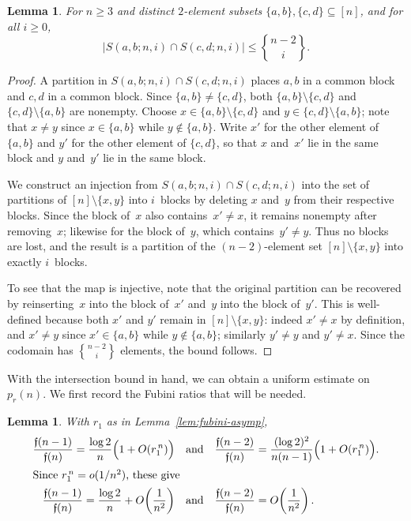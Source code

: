 \documentclass[a4paper,11pt,UKenglish]{article}
\newcommand{\setstirling}[2]{%
  \genfrac{\{}{\}}{0pt}{}{{#1}}{{#2}}}
\newcommand{\fub}[1]{\mathfrak{f}(#1)}
\newtheorem{lemma}[theorem]{Lemma}
\theoremstyle{definition}
\begin{document}
\begin{lemma}\label{lem:intersection}
For $n \geq 3$ and distinct $2$-element subsets
$\{a,b\}, \{c,d\} \subseteq [n]$, and for all $i\ge 0$,
\[
  |S(a,b;n,i) \cap S(c,d;n,i)| \leq \setstirling{n-2}{i}.
\]
\end{lemma}

\begin{proof}
A partition in $S(a,b;n,i) \cap S(c,d;n,i)$ places $a,b$ in a
common block and $c,d$ in a common block.
Since $\{a,b\} \neq \{c,d\}$, both
$\{a,b\} \setminus \{c,d\}$ and $\{c,d\} \setminus \{a,b\}$
are nonempty.
Choose $x \in \{a,b\} \setminus \{c,d\}$ and
$y \in \{c,d\} \setminus \{a,b\}$;
note that $x \neq y$ since $x \in \{a,b\}$ while
$y \notin \{a,b\}$.
Write $x'$ for the other element of $\{a,b\}$ and $y'$ for the
other element of $\{c,d\}$, so that $x$ and~$x'$ lie in the same
block and $y$ and~$y'$ lie in the same block.

We construct an injection from $S(a,b;n,i) \cap S(c,d;n,i)$ into
the set of partitions of $[n] \setminus \{x,y\}$ into $i$~blocks
by deleting $x$ and~$y$ from their respective blocks.
Since the block of~$x$ also contains~$x' \neq x$, it remains
nonempty after removing~$x$; likewise for the block of~$y$, which
contains~$y' \neq y$.
Thus no blocks are lost, and the result is a partition of the
$(n-2)$-element set $[n] \setminus \{x,y\}$ into exactly
$i$~blocks.

To see that the map is injective, note that the original partition
can be recovered by reinserting~$x$ into the block of~$x'$ and~$y$
into the block of~$y'$.
This is well-defined because both $x'$ and $y'$ remain in
$[n]\setminus\{x,y\}$: indeed $x' \neq x$ by definition,
and $x' \neq y$ since $x' \in \{a,b\}$ while $y \notin \{a,b\}$;
similarly $y' \neq y$ and $y' \neq x$.
Since the codomain has $\setstirling{n-2}{i}$ elements, the bound
follows.
\end{proof}

With the intersection bound in hand, we can obtain a uniform
estimate on~$p_r(n)$.
We first record the Fubini ratios that will be needed.

\begin{lemma}\label{lem:fubini-ratios}
With $r_1$ as in Lemma~\ref{lem:fubini-asymp},
\begin{align*}
  \frac{\fub{n-1}}{\fub{n}}
  =\frac{\log 2}{n}\Bigl(1+O(r_1^{\,n})\Bigr)
  \quad & \text{and} \quad
  \frac{\fub{n-2}}{\fub{n}}
  =\frac{(\log 2)^2}{n(n-1)}\Bigl(1+O(r_1^{\,n})\Bigr). \\
\intertext{Since $r_1^{\,n} = o(1/n^2)$, these give}
  \frac{\fub{n-1}}{\fub{n}}
  = \frac{\log 2}{n} + O\!\left(\frac{1}{n^2}\right)
  \quad & \text{and} \quad
  \frac{\fub{n-2}}{\fub{n}}
  = O\!\left(\frac{1}{n^2}\right).
\end{align*}
\end{lemma}
\end{document}
